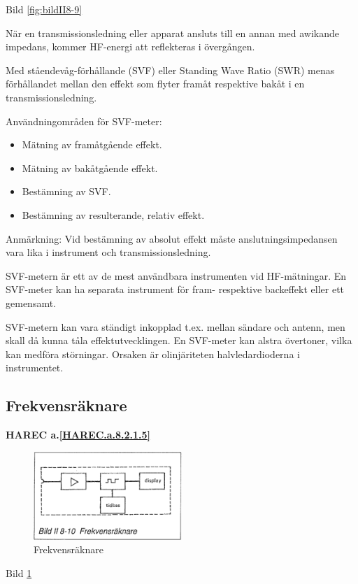 Bild \ref{fig:bildII8-9}

När en transmissionsledning eller apparat ansluts till en annan med
awikande impedans, kommer HF-energi att reflekteras i övergången.

Med ståendevåg-förhållande (SVF) eller Standing Wave Ratio (SWR)
menas förhållandet mellan den effekt som flyter framåt respektive
bakåt i en transmissionsledning.

Användningområden för SVF-meter:
\begin{itemize}
\item Mätning av framåtgående effekt.
\item Mätning av bakåtgående effekt.
\item Bestämning av SVF.
\item Bestämning av resulterande, relativ effekt.
\end{itemize}

Anmärkning: Vid bestämning av absolut effekt måste
anslutningsimpedansen vara lika i instrument och transmissionsledning.

SVF-metern är ett av de mest användbara instrumenten vid
HF-mätningar. En SVF-meter kan ha separata instrument för fram-
respektive backeffekt eller ett gemensamt.

SVF-metern kan vara ständigt inkopplad t.ex. mellan sändare och
antenn, men skall då kunna tåla effektutvecklingen. En SVF-meter kan
alstra övertoner, vilka kan medföra störningar. Orsaken är
olinjäriteten halvledardioderna i instrumentet.

\subsection{Frekvensräknare}
\textbf{
HAREC a.\ref{HAREC.a.8.2.1.5}\label{myHAREC.a.8.2.1.5}
}

\begin{figure}
  \includegraphics[width=0.5\textwidth]{images/bild_2_8-10}
  \caption{Frekvensräknare}
  \label{fig:bildII8-10}
\end{figure}

Bild \ref{fig:bildII8-10}

